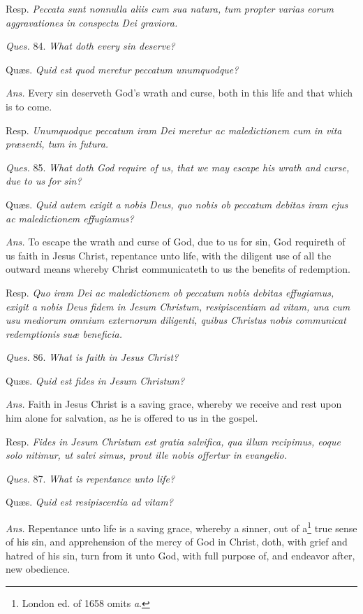 Resp. \emph{Peccata sunt nonnulla aliis cum sua natura, tum propter varias eorum aggravationes in conspectu Dei graviora.}

\emph{Ques.} 84. \emph{What doth every sin deserve?}

Quæs. \emph{Quid est quod meretur peccatum unumquodque?}

\emph{Ans.} Every sin deserveth God's wrath and curse, both in this life and that which is to come.

Resp. \emph{Unumquodque peccatum iram Dei meretur ac maledictionem cum in vita præsenti, tum in futura.}

\emph{Ques.} 85. \emph{What doth God require of us, that we may escape his wrath and curse, due to us for sin?}

Quæs. \emph{Quid autem exigit a nobis Deus, quo nobis ob peccatum debitas iram ejus ac maledictionem effugiamus?}

\emph{Ans.} To escape the wrath and curse of God, due to us for sin, God requireth of us faith in Jesus Christ, repentance unto life, with the diligent use of all the outward means whereby Christ communicateth to us the benefits of redemption.

Resp. \emph{Quo iram Dei ac maledictionem ob peccatum nobis debitas effugiamus, exigit a nobis Deus fidem in Jesum Christum, resipiscentiam ad vitam, una cum usu mediorum omnium externorum diligenti, quibus Christus nobis communicat redemptionis suæ beneficia.}

\emph{Ques.} 86. \emph{What is faith in Jesus Christ?}

Quæs. \emph{Quid est fides in Jesum Christum?}

\emph{Ans.} Faith in Jesus Christ is a saving grace, whereby we receive and rest upon him alone for salvation, as he is offered to us in the gospel.

Resp. \emph{Fides in Jesum Christum est gratia salvifica, qua illum recipimus, eoque solo nitimur, ut salvi simus, prout ille nobis offertur in evangelio.}

\emph{Ques.} 87. \emph{What is repentance unto life?}

Quæs. \emph{Quid est resipiscentia ad vitam?}

\emph{Ans.} Repentance unto life is a saving grace, whereby a sinner, out of a\footnote{London ed. of 1658 omits \emph{a}.} true sense of his sin, and apprehension of the mercy of God in Christ, doth, with grief and hatred of his sin, turn from it unto God, with full purpose of, and endeavor after, new obedience.

